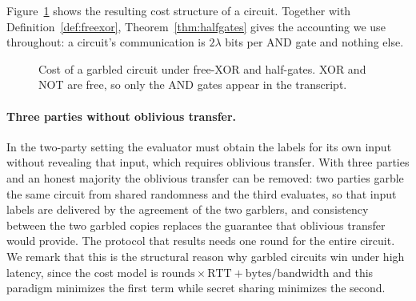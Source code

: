 \documentclass[11pt]{article}
\begin{document}
Figure~\ref{fig:halfgate} shows the resulting cost structure of a circuit. Together with
Definition~\ref{def:freexor}, Theorem~\ref{thm:halfgates} gives the accounting we use
throughout: a circuit's communication is $2\lambda$ bits per AND gate and nothing else.

\begin{figure}[t]
\centering
{}
\caption{Cost of a garbled circuit under free-XOR and half-gates. XOR and NOT are free, so
only the AND gates appear in the transcript.}
\label{fig:halfgate}
\end{figure}

\paragraph{Three parties without oblivious transfer.} In the two-party setting the evaluator
must obtain the labels for its own input without revealing that input, which requires
oblivious transfer. With three parties and an honest majority the oblivious transfer can be
removed: two parties garble the same circuit from shared randomness and the third evaluates,
so that input labels are delivered by the agreement of the two garblers, and consistency
between the two garbled copies replaces the guarantee that oblivious transfer would provide.
The protocol that results needs one round for the entire circuit. We remark that this is the
structural reason why garbled circuits win under high latency, since the cost model is
$\text{rounds}\times\text{RTT} + \text{bytes}/\text{bandwidth}$ and this paradigm minimizes
the first term while secret sharing minimizes the second.
\end{document}
